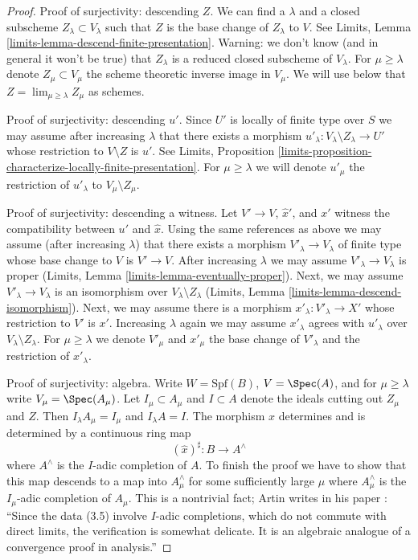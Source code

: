 \begin{proof}
\medskip\noindent
Proof of surjectivity: descending $Z$. We can find a $\lambda$
and a closed subscheme $Z_\lambda \subset V_\lambda$ such that
$Z$ is the base change of $Z_\lambda$ to $V$. See
Limits, Lemma \ref{limits-lemma-descend-finite-presentation}.
Warning: we don't know (and in general it won't be true)
that $Z_\lambda$ is a reduced closed subscheme of $V_\lambda$.
For $\mu \geq \lambda$ denote $Z_\mu \subset V_\mu$ the scheme theoretic
inverse image in $V_\mu$. We will use below that
$Z = \lim_{\mu \geq \lambda} Z_\mu$ as schemes.

\medskip\noindent
Proof of surjectivity: descending $u'$.
Since $U'$ is locally of finite type over $S$
we may assume after increasing $\lambda$
that there exists a morphism
$u'_\lambda : V_\lambda \setminus Z_\lambda \to U'$
whose restriction to $V \setminus Z$ is $u'$.
See Limits, Proposition
\ref{limits-proposition-characterize-locally-finite-presentation}.
For $\mu \geq \lambda$ we will denote $u'_\mu$ the restriction
of $u'_\lambda$ to $V_\mu \setminus Z_\mu$.

\medskip\noindent
Proof of surjectivity: descending a witness.
Let $V' \to V$, $\hat x'$, and $x'$ witness the compatibility between
$u'$ and $\hat x$. Using the same references as above we may assume
(after increasing $\lambda$) that there exists a morphism
$V'_\lambda \to V_\lambda$ of finite type whose base change to $V$
is $V' \to V$. After increasing $\lambda$ we may assume
$V'_\lambda \to V_\lambda$ is proper
(Limits, Lemma \ref{limits-lemma-eventually-proper}).
Next, we may assume $V'_\lambda \to V_\lambda$ is an isomorphism
over $V_\lambda \setminus Z_\lambda$
(Limits, Lemma \ref{limits-lemma-descend-isomorphism}).
Next, we may assume there is a morphism $x'_\lambda : V'_\lambda \to X'$
whose restriction to $V'$ is $x'$.
Increasing $\lambda$ again we may assume $x'_\lambda$
agrees with $u'_\lambda$ over $V_\lambda \setminus Z_\lambda$.
For $\mu \geq \lambda$ we denote
$V'_\mu$ and $x'_\mu$ the base change of $V'_\lambda$ and the
restriction of $x'_\lambda$.

\medskip\noindent
Proof of surjectivity: algebra.
Write $W = \text{Spf}(B)$, $V = \Spec(A)$, and
for $\mu \geq \lambda$ write $V_\mu = \Spec(A_\mu)$.
Let $I_\mu \subset A_\mu$ and $I \subset A$
denote the ideals cutting out $Z_\mu$ and $Z$.
Then $I_\lambda A_\mu = I_\mu$ and $I_\lambda A = I$.
The morphism $\hat x$ determines and is determined by a
continuous ring map
$$
(\hat x)^\sharp : B \longrightarrow A^\wedge
$$
where $A^\wedge$ is the $I$-adic completion of $A$.
To finish the proof we have to show that this map descends to a map into
$A_\mu^\wedge$ for some sufficiently large $\mu$ where $A_\mu^\wedge$
is the $I_\mu$-adic completion of $A_\mu$.
This is a nontrivial fact; Artin writes in his paper
\cite{ArtinII}: ``Since the data (3.5) involve $I$-adic completions,
which do not commute with direct limits, the verification is somewhat
delicate. It is an algebraic analogue of a convergence proof in analysis.''


\end{proof}
